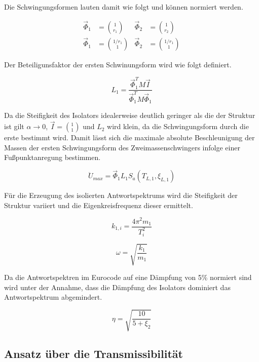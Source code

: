 Die Schwingungsformen lauten damit wie folgt und können normiert werden.

\begin{align}
\vec{\Phi}_1 &= \binom{1}{r_1} & \vec{\Phi}_2 &= \binom{1}{r_2}\\
\vec{\Phi}_1 &= \binom{1/r_1}{1} & \vec{\Phi}_2 &= \binom{1/r_1}{1}
\end{align}

Der Beteiligunsfaktor der ersten Schwinungsform wird wie folgt definiert.

\begin{equation}
L_1 = \frac{\vec{\Phi}_1^T M \vec{I}}{\vec{\Phi}_1^T M \vec{\Phi}_1}
\end{equation}

Da die Steifigkeit des Isolators idealerweise deutlich geringer als die der Struktur ist gilt $\alpha \rightarrow 0$, $\vec{I} = \binom{1}{1}$ und $L_2$ wird klein, da die Schwingungsform durch die erste bestimmt wird.
Damit lässt sich die maximale absolute Beschleunigung der Massen der ersten Schwingungsform des Zweimassenschwingers infolge einer Fußpunktanregung bestimmen.

\begin{equation}
\ddot U_{max} = \vec{\Phi}_1 L_1 S_a(T_{L,1}, \xi_{L,1})
\end{equation}

Für die Erzeugung des isolierten Antwortspektrums wird die Steifigkeit der Struktur variiert und die Eigenkreisfrequenz dieser ermittelt.

\begin{equation}
k_{1,i} = \frac{4 \pi^2 m_1}{T_i^2}
\end{equation}

\begin{equation}
\omega = \sqrt{\frac{k_1}{m_1}}
\end{equation}

Da die Antwortspektren im Eurocode auf eine Dämpfung von 5\% normiert sind wird unter der Annahme, dass die Dämpfung des Isolators dominiert das Antwortspektrum abgemindert.

\begin{equation}\label{eta}
\eta = \sqrt{\frac{10}{5 + \xi_2}}
\end{equation}

\subsection{Ansatz über die Transmissibilität}
\label{sec:ansatztrasnm}

